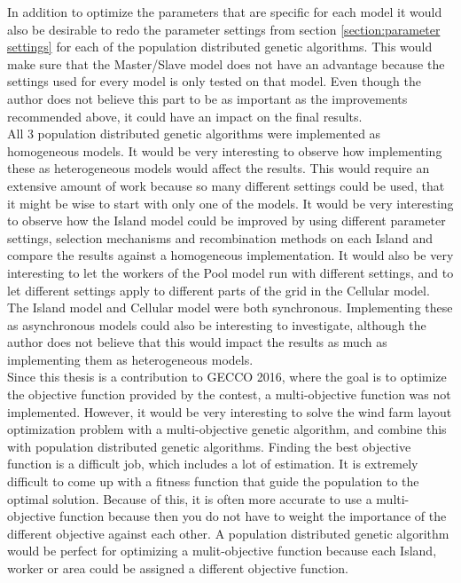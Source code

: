 \noindent In addition to optimize the parameters that are specific for each model it would also be desirable to redo the parameter settings from section \ref{section:parameter settings} for each of the population distributed genetic algorithms. This would make sure that the Master/Slave model does not have an advantage because the settings used for every model is only tested on that model. Even though the author does not believe this part to be as important as the improvements  recommended above, it could have an impact on the final results. \\


\noindent All 3 population distributed genetic algorithms were implemented as homogeneous models. It would be very interesting to observe how implementing these as heterogeneous models would affect the results. This would require an extensive amount of work because so many different settings could be used, that it might be wise to start with only one of the models. It would be very interesting to observe how the Island model could be improved by using different parameter settings, selection mechanisms and recombination methods on each Island and compare the results against a homogeneous implementation. It would also be very interesting to let the workers of the Pool model run with different settings, and to let different settings apply to different parts of the grid in the Cellular model.\\


\noindent The Island model and Cellular model were both synchronous. Implementing these as asynchronous models could also be interesting to investigate, although the author does not believe that this would impact the results as much as implementing them as heterogeneous models.\\


\noindent Since this thesis is a contribution to GECCO 2016, where the goal is to optimize the objective function provided by the contest, a multi-objective function was not implemented. However, it would be very interesting to solve the wind farm layout optimization problem with a multi-objective genetic algorithm, and combine this with population distributed genetic algorithms. Finding the best objective function is a difficult job, which includes a lot of estimation. It is extremely difficult to come up with a fitness function that guide the population to the optimal solution. Because of this, it is often more accurate to use a multi-objective function because then you do not have to weight the importance of the different objective against each other. A population distributed genetic algorithm would be perfect for optimizing a mulit-objective function because each Island, worker or area could be assigned a different objective function.\\


